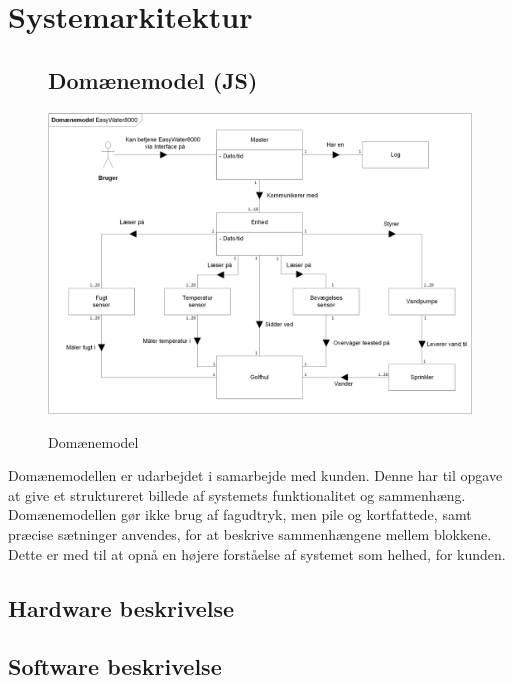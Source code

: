 \chapter{Systemarkitektur}

\begin{figure}[htbp] \centering
\section{Domænemodel (JS)}
{\includegraphics[width=\textwidth]{filer/systemarkitektur/Domainmodel}}
\caption{Domænemodel}
\label{lab:domainmodel}
\end{figure}
Domænemodellen er udarbejdet i samarbejde med kunden. Denne har til opgave at give et struktureret billede af systemets funktionalitet og sammenhæng. Domænemodellen gør ikke brug af fagudtryk, men pile og kortfattede, samt præcise sætninger anvendes, for at beskrive sammenhængene mellem blokkene. Dette er med til at opnå en højere forståelse af systemet som helhed, for kunden.

\newpage
\section{Hardware beskrivelse}


\section{Software beskrivelse}
